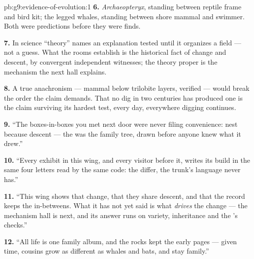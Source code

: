 \begin{solution}{pb:g9:evidence-of-evolution:1}
\textbf{6.} \emph{Archaeopteryx}, standing between
reptile frame and bird kit; the legged  whales,
standing between shore mammal and swimmer. Both were
predictions before they were finds.

\textbf{7.} In science ``theory'' names an explanation
tested until it organizes a field --- not a guess. What
the rooms establish is the historical fact of change and
descent, by convergent independent witnesses; the theory
proper is the mechanism the next hall explains.

\textbf{8.} A true anachronism --- mammal  below
trilobite layers, verified --- would break the order the
claim demands. That no dig in two centuries has produced
one is the claim surviving its hardest test, every day,
everywhere digging continues.

\textbf{9.} ``The boxes-in-boxes you met next door were
never filing convenience:  nest because
descent  --- the  was the family
tree, drawn before anyone knew what it drew.''

\textbf{10.} ``Every exhibit in this wing, and every
visitor before it, writes its build in the same four
letters read by the same code: the  differ, the
trunk's language never has.''

\textbf{11.} ``This wing shows that  change, that
they share descent, and that the record keeps the
in-betweens. What it has not yet said is what \emph{drives}
the change --- the mechanism hall is next, and its answer
runs on variety, inheritance and the 's
checks.''

\textbf{12.} ``All life is one family album, and the
rocks kept the early pages --- given time, cousins grow
as different as whales and bats, and stay family.''
\end{solution}
